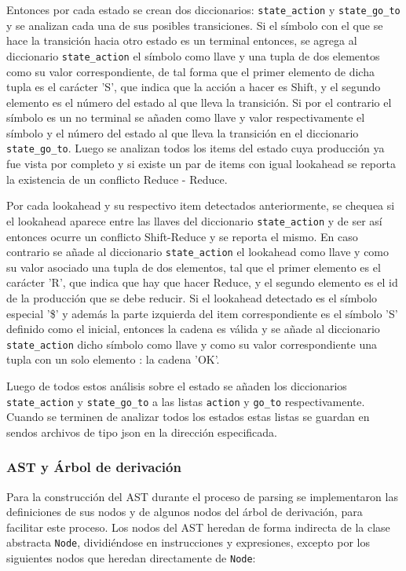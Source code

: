 Entonces por cada estado se crean dos diccionarios: \verb|state_action| y \verb|state_go_to| y se analizan cada una de sus posibles transiciones. Si el s\'imbolo con el que se hace la transici\'on hacia otro estado es un terminal entonces, se agrega al diccionario \verb|state_action| el s\'imbolo como llave y una tupla de dos elementos como su valor correspondiente, de tal forma que el primer elemento de dicha tupla es el car\'acter 'S', que indica que la acci\'on a hacer es Shift, y el segundo elemento es el n\'umero del estado al que lleva la transici\'on. Si por el contrario el s\'imbolo es un no terminal se a\~{n}aden como llave y valor respectivamente el s\'imbolo y el n\'umero del estado al que lleva la transici\'on en el diccionario \verb|state_go_to|. Luego se analizan todos los items del estado cuya producci\'on ya fue vista por completo y si existe un par de items con igual lookahead se reporta la existencia de un conflicto Reduce - Reduce.

Por cada lookahead y su respectivo item detectados anteriormente, se chequea si el lookahead aparece entre las llaves del diccionario \verb|state_action| y de ser as\'i entonces ocurre un conflicto Shift-Reduce y se reporta el mismo. En caso contrario se a\~{n}ade al diccionario \verb|state_action| el lookahead como llave y como su valor asociado una tupla de dos elementos, tal que el primer elemento es el car\'acter 'R', que indica que hay que hacer Reduce, y el segundo elemento es el id de la producci\'on que se debe reducir. Si el lookahead detectado es el s\'imbolo especial '\$' y adem\'as la parte izquierda del item correspondiente es el s\'imbolo 'S' definido como el inicial, entonces la cadena es v\'alida y se a\~{n}ade al diccionario \verb|state_action| dicho s\'imbolo como llave y como su valor correspondiente una tupla con un solo elemento : la cadena 'OK'. 

Luego de todos estos an\'alisis sobre el estado se a\~{n}aden los diccionarios \verb|state_action| y \verb|state_go_to| a las listas \verb|action| y \verb|go_to| respectivamente. Cuando se terminen de analizar todos los estados estas listas se guardan en sendos archivos de tipo json en la direcci\'on especificada.

\subsubsection{AST y \'Arbol de derivaci\'on}
Para la construcci\'on del AST durante el proceso de parsing se implementaron las definiciones de sus nodos y de algunos nodos del \'arbol de derivaci\'on, para facilitar este proceso. Los nodos del AST heredan de forma indirecta de la clase abstracta \verb|Node|, dividi\'endose en instrucciones y expresiones, excepto por los siguientes nodos que heredan directamente de \verb|Node|:

